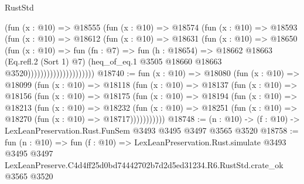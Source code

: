 \begin{lexlean}{RustStd}
\begin{coremodule}
                              (fun (x : @10) =>
                              @18555
                                (fun (x : @10) =>
                                @18574
                                  (fun (x : @10) =>
                                  @18593
                                    (fun (x : @10) =>
                                    @18612
                                      (fun (x : @10) =>
                                      @18631
                                        (fun (x : @10) =>
                                        @18650
                                          (fun (x : @10) =>
                                          fun (fn : @7) =>
                                          fun (h : @18654) =>
                                          @18662
                                            @18663
                                            (Eq.refl.{2} (Sort 1) @7)
                                            (heq_of_eq.{1}
                                              @3505
                                              @18660
                                              @18663
                                              @3520)))))))))))))))))))))
@18740 := fun (x : @10) =>
  @18080
    (fun (x : @10) =>
    @18099
      (fun (x : @10) =>
      @18118
        (fun (x : @10) =>
        @18137
          (fun (x : @10) =>
          @18156
            (fun (x : @10) =>
            @18175
              (fun (x : @10) =>
              @18194
                (fun (x : @10) =>
                @18213
                  (fun (x : @10) =>
                  @18232
                    (fun (x : @10) =>
                    @18251 (fun (x : @10) => @18270 (fun (x : @10) => @18717)))))))))))
@18748 := (n : @10) -> (f : @10) -> LexLeanPreservation.Rust.FunSem @3493 @3495 @3497 @3565 @3520
@18758 := fun (n : @10) =>
  fun (f : @10) =>
  LexLeanPreservation.Rust.simulate
    @3493
    @3495
    @3497
    LexLeanPreserve.C4d4ff25d0bd74442702b7d2d5ed31234.R6.RustStd.crate_ok
    @3565
    @3520
\end{coremodule}
\end{lexlean}
